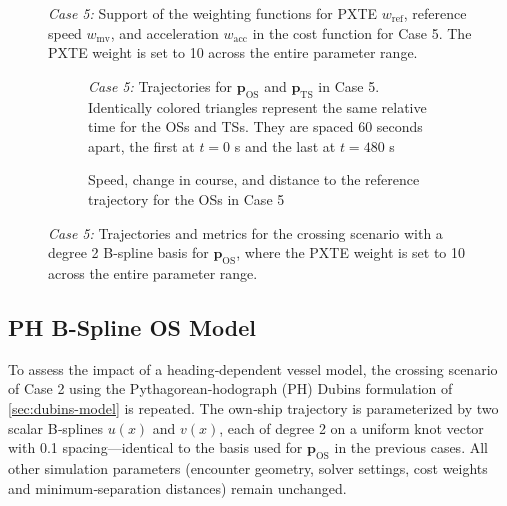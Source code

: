 \begin{figure}[phtb]
    \centering
    
    \caption{\textit{Case 5:} Support of the weighting functions for PXTE $w_\text{ref}$, reference speed $w_\text{mv}$, and acceleration $w_\text{acc}$ in the cost function for Case 5. The PXTE weight is set to 10 across the entire parameter range.}
    \label{fig:weight-functions-confined-waters}
\end{figure}

\begin{figure}
    \centering
    \begin{subfigure}[b]{\textwidth}
        \centering
        
        \caption{\textit{Case 5:} Trajectories for $\mathbf p_\text{OS}$ and $\mathbf p_\text{TS}$ in Case 5. Identically colored triangles represent the same relative time for the OSs and TSs. They are spaced 60 seconds apart, the first at $t=0$ s and the last at $t=480$ s}
        \label{fig:crossing-advanced-scenario-10-2-xte-weight-traj}
    \end{subfigure}
    \begin{subfigure}[b]{\textwidth}
        \centering
        
        \caption{Speed, change in course, and distance to the reference trajectory for the OSs in Case 5}
        \label{fig:crossing-advanced-scenario-10-2-xte-weight}
    \end{subfigure}
    \caption{\textit{Case 5:} Trajectories and metrics for the crossing scenario with a degree 2 B-spline basis for $\mathbf p_\text{OS}$, where the PXTE weight is set to 10 across the entire parameter range.}
\end{figure}


\FloatBarrier
\subsection{PH B-Spline OS Model}\label{sec:ph-b-spline-os-model}

To assess the impact of a heading‐dependent vessel model, the crossing scenario of Case 2 using the Pythagorean‐hodograph (PH) Dubins formulation of \cref{sec:dubins-model} is repeated. The own‐ship trajectory is parameterized by two scalar B‐splines \(u(x)\) and \(v(x)\), each of degree 2 on a uniform knot vector with 0.1 spacing---identical to the basis used for \(\mathbf p_\text{OS}\) in the previous cases. All other simulation parameters (encounter geometry, solver settings, cost weights and minimum‐separation distances) remain unchanged.

